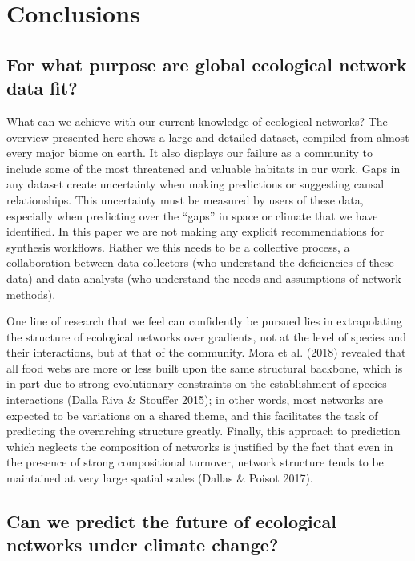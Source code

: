 \hypertarget{conclusions}{%
\section{Conclusions}\label{conclusions}}

\hypertarget{for-what-purpose-are-global-ecological-network-data-fit}{%
\subsection{For what purpose are global ecological network data
fit?}\label{for-what-purpose-are-global-ecological-network-data-fit}}

What can we achieve with our current knowledge of ecological networks?
The overview presented here shows a large and detailed dataset, compiled
from almost every major biome on earth. It also displays our failure as
a community to include some of the most threatened and valuable habitats
in our work. Gaps in any dataset create uncertainty when making
predictions or suggesting causal relationships. This uncertainty must be
measured by users of these data, especially when predicting over the
``gaps'' in space or climate that we have identified. In this paper we
are not making any explicit recommendations for synthesis workflows.
Rather we this needs to be a collective process, a collaboration between
data collectors (who understand the deficiencies of these data) and data
analysts (who understand the needs and assumptions of network methods).

One line of research that we feel can confidently be pursued lies in
extrapolating the structure of ecological networks over gradients, not
at the level of species and their interactions, but at that of the
community. Mora et al. (2018) revealed that all food webs are more or
less built upon the same structural backbone, which is in part due to
strong evolutionary constraints on the establishment of species
interactions (Dalla Riva \& Stouffer 2015); in other words, most
networks are expected to be variations on a shared theme, and this
facilitates the task of predicting the overarching structure greatly.
Finally, this approach to prediction which neglects the composition of
networks is justified by the fact that even in the presence of strong
compositional turnover, network structure tends to be maintained at very
large spatial scales (Dallas \& Poisot 2017).

\hypertarget{can-we-predict-the-future-of-ecological-networks-under-climate-change}{%
\subsection{Can we predict the future of ecological networks under
climate
change?}\label{can-we-predict-the-future-of-ecological-networks-under-climate-change}}

